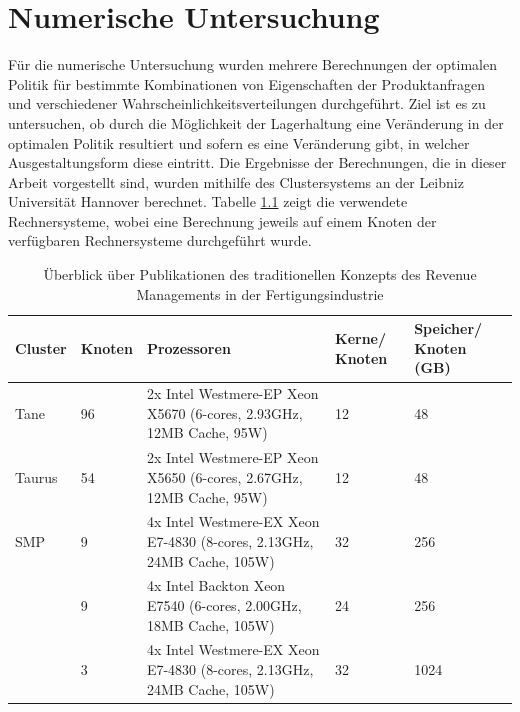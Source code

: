 \chapter{Numerische Untersuchung}
\setcounter{footnote}{4}  %

Für die numerische Untersuchung wurden mehrere Berechnungen der optimalen Politik für bestimmte Kombinationen von Eigenschaften der Produktanfragen und verschiedener Wahrscheinlichkeitsverteilungen durchgeführt. Ziel ist es zu untersuchen, ob durch die Möglichkeit der Lagerhaltung eine Veränderung in der optimalen Politik resultiert und sofern es eine Veränderung gibt, in welcher Ausgestaltungsform diese eintritt. Die Ergebnisse der Berechnungen, die in dieser Arbeit vorgestellt sind, wurden mithilfe des Clustersystems an der Leibniz Universität Hannover berechnet. Tabelle \ref{Hardware} zeigt die verwendete Rechnersysteme, wobei eine Berechnung jeweils auf einem Knoten der verfügbaren Rechnersysteme durchgeführt wurde.

\begin{table}[h!]
\renewcommand{\arraystretch}{1.5}
  \begin{center}
  \begin{small}
    \caption{Überblick über Publikationen des traditionellen Konzepts des Revenue Managements in der Fertigungsindustrie}  \label{Hardware}
    \vspace*{3mm}
    \begin{tabular}{llp{6cm}p{1.5cm}p{1.5cm}}   %
     Cluster & Knoten  & Prozessoren & Kerne/ Knoten  & Speicher/ Knoten (GB) \\  \hline
  Tane   & 96 & 2x Intel Westmere-EP Xeon X5670 (6-cores, 2.93GHz, 12MB Cache, 95W)  & 12 & 48 \\
   Taurus  & 54 & 2x Intel Westmere-EP Xeon X5650 (6-cores, 2.67GHz, 12MB Cache, 95W)  & 12 &  48 \\
   SMP  & 9 &4x Intel Westmere-EX Xeon E7-4830 (8-cores, 2.13GHz, 24MB Cache, 105W)   & 32 & 256  \\
    & 9 & 4x Intel Backton Xeon E7540 (6-cores, 2.00GHz, 18MB Cache, 105W)   & 24 & 256 \\
      & 3 & 4x Intel Westmere-EX Xeon E7-4830 (8-cores, 2.13GHz, 24MB Cache, 105W)   & 32 & 1024  \\ \hline
    \end{tabular} \\[3mm]
    \end{small}
  \end{center}
\end{table}

